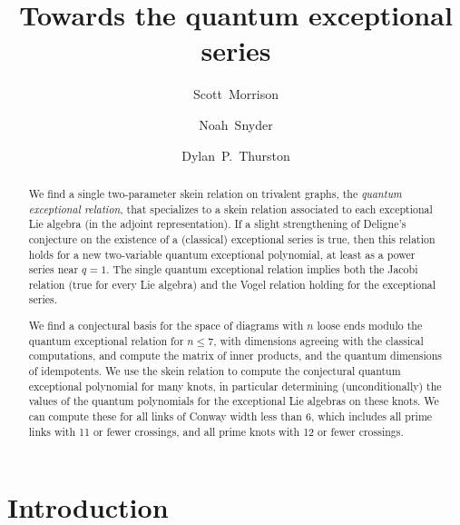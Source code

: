 \documentclass[12pt]{amsart}
\begin{document}
\title{Towards the quantum exceptional series}

\author[Morrison]{Scott~Morrison}
\address{Mathematical Sciences Institute, Australian National University}

\author[Snyder]{Noah~Snyder}
\address{Bloomington, Indiana, USA}

\author[Thurston]{Dylan~P.~Thurston}
\address{Bloomington, Indiana, USA}

\begin{abstract}
  We find a single two-parameter skein relation on trivalent graphs,
  the \emph{quantum exceptional relation}, that specializes to a skein
  relation associated to each exceptional Lie algebra (in the adjoint
  representation). If a slight
  strengthening of Deligne's conjecture on the existence of a
  (classical) exceptional series is true, then this relation
  holds for a new two-variable quantum exceptional polynomial, at
  least as a power series near $q=1$. The
  single quantum exceptional relation implies both the
  Jacobi relation (true for every Lie algebra) and
  the Vogel relation holding for the exceptional series.

  We find a conjectural basis for the space of diagrams with $n$ loose
  ends modulo the quantum exceptional relation for $n \le 7$, with
  dimensions agreeing with the classical computations, and compute
  the matrix of inner products, and the quantum dimensions of idempotents.
  We use the
  skein relation to compute the conjectural quantum exceptional
  polynomial for many knots, in particular
  determining (unconditionally) the values of the quantum polynomials
  for the exceptional Lie algebras on
  these knots. We can compute these for all links of Conway width less 
  than $6$, which includes all prime links with 11 or fewer crossings, and 
  all prime knots with 12 or fewer crossings.
\end{abstract}


\maketitle

\tableofcontents

\section{Introduction}
\label{sec:introduction}
\end{document}
